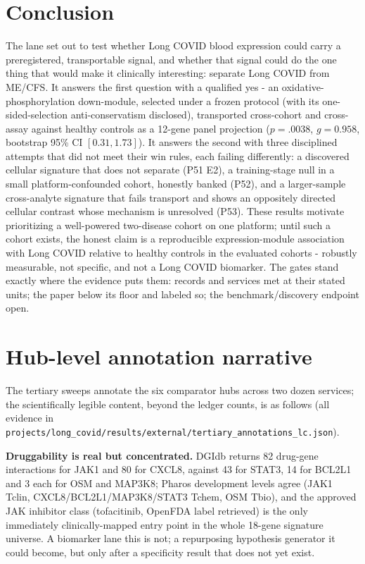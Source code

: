 \documentclass[11pt,a4paper]{article}
\begin{document}
\section{Conclusion}
The lane set out to test whether Long COVID blood expression could carry a
preregistered, transportable signal, and whether that signal could do the one
thing that would make it clinically interesting: separate Long COVID from
ME/CFS. It answers the first question with a qualified yes - an
oxidative-phosphorylation down-module, selected under a frozen protocol
(with its one-sided-selection anti-conservatism disclosed), transported
cross-cohort and cross-assay against healthy controls as a 12-gene panel
projection ($p=.0038$, $g=0.958$, bootstrap 95\% CI $[0.31, 1.73]$). It
answers the second with three disciplined attempts that did not meet their
win rules, each failing differently: a discovered cellular signature that
does not separate (P51 E2), a training-stage null in a small
platform-confounded cohort, honestly banked (P52), and a larger-sample
cross-analyte signature that fails transport and shows an oppositely
directed cellular contrast whose mechanism is unresolved (P53). These
results motivate prioritizing a well-powered two-disease cohort on one
platform; until such a cohort exists, the honest claim is a reproducible
expression-module association with Long COVID relative to healthy controls
in the evaluated cohorts - robustly measurable, not specific, and not a
Long COVID biomarker. The gates stand exactly where the evidence puts them:
records and services met at their stated units; the paper below its floor
and labeled so; the benchmark/discovery endpoint open.

\section{Hub-level annotation narrative}
The tertiary sweeps annotate the six comparator hubs across two dozen
services; the scientifically legible content, beyond the ledger counts, is as
follows (all evidence in
\texttt{projects/long\_covid/results/external/tertiary\_annotations\_lc.json}).

\textbf{Druggability is real but concentrated.} DGIdb returns 82 drug-gene
interactions for JAK1 and 80 for CXCL8, against 43 for STAT3, 14 for BCL2L1
and 3 each for OSM and MAP3K8; Pharos development levels agree (JAK1 Tclin,
CXCL8/BCL2L1/MAP3K8/STAT3 Tchem, OSM Tbio), and the approved JAK inhibitor
class (tofacitinib, OpenFDA label retrieved) is the only immediately
clinically-mapped entry point in the whole 18-gene signature universe. A
biomarker lane this is not; a repurposing hypothesis generator it could
become, but only after a specificity result that does not yet exist.
\end{document}
